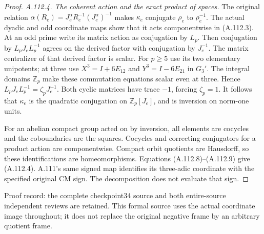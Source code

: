 \begin{proof}
\emph{A.112.4. The coherent action and the exact product of spaces.}
The original relation
\(\alpha(R_e)=J_e^\alpha R_e^{-1}(J_e^\alpha)^{-1}\)
makes \(\kappa_e\) conjugate \(\rho_e\) to \(\rho_e^{-1}\).
The actual dyadic and odd coordinate maps show that it acts
componentwise in (A.112.3).
At an odd prime write its matrix action as conjugation by \(L_p\).
Then conjugation by \(L_pJ_eL_p^{-1}\) agrees on the derived factor
with conjugation by \(J_e^{-1}\).
The matrix centralizer of that derived factor is scalar.
For \(p\geq5\) use its two elementary unipotents; at three use
\(X^3=I+6E_{12}\) and \(Y^3=I-6E_{21}\) in \(G_3'\).
The integral domains \(\mathbb Z_p\) make these commutation
equations scalar even at three. Hence
\(L_pJ_eL_p^{-1}=\zeta_pJ_e^{-1}\).
Both cyclic matrices have trace \(-1\), forcing \(\zeta_p=1\).
It follows that \(\kappa_e\) is the quadratic conjugation on
\(\mathbb Z_p[J_e]\), and is inversion on norm-one units.

For an abelian compact group acted on by inversion, all elements
are cocycles and the coboundaries are the squares.
Cocycles and correcting conjugators for a product action are
componentwise. Compact orbit quotients are Hausdorff, so these
identifications are homeomorphisms. Equations (A.112.8)--(A.112.9)
give (A.112.4). A.111's same signed map identifies its three-adic
coordinate with the specified original CM sign. The decomposition
does not evaluate that sign.
\end{proof}

\begingroup\footnotesize\raggedright
Proof record: the complete checkpoint34 source
and both entire-source independent reviews are retained.
This formal source uses the actual coordinate image throughout;
it does not replace the original negative frame by an arbitrary
quotient frame.\par\endgroup
